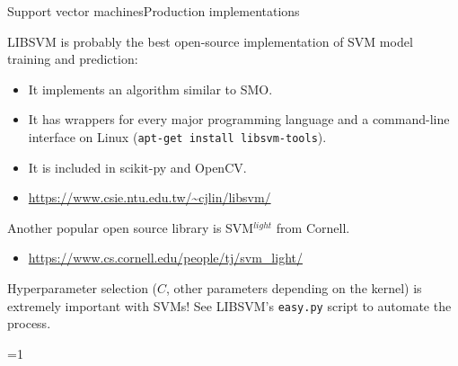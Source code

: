 \documentclass{beamer}
\begin{document}
\begin{frame}{Support vector machines}{Production implementations}

  LIBSVM is probably the best open-source implementation of SVM
  model training and prediction:
  \begin{itemize}
  \item It implements an algorithm similar to SMO.
  \item It has wrappers for every major programming language and a
    command-line interface on Linux (\texttt{apt-get install
      libsvm-tools}).
  \item It is included in scikit-py and OpenCV.
  \item \url{https://www.csie.ntu.edu.tw/~cjlin/libsvm/}
  \end{itemize}

  \medskip
  
  Another popular open source library is SVM$^{light}$ from Cornell.
  \begin{itemize}
    \item \url{https://www.cs.cornell.edu/people/tj/svm_light/}
  \end{itemize}

  \medskip

  \alert{Hyperparameter selection} ($C$, other parameters depending on
  the kernel) is extremely important with SVMs!  See LIBSVM's
  \texttt{easy.py} script to automate the process.

\end{frame}

\def\show{0}
\ifnum\show=1
\fi
\end{document}
